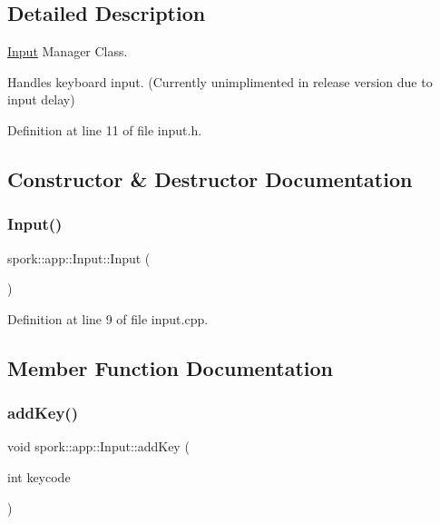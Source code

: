 \subsection{Detailed Description}
\hyperlink{classspork_1_1app_1_1_input}{Input} Manager Class. 

Handles keyboard input. (Currently unimplimented in release version due to input delay) 

Definition at line 11 of file input.\+h.



\subsection{Constructor \& Destructor Documentation}
\mbox{\label{classspork_1_1app_1_1_input_ade1285875cb237a23704d76b69957989}} 
\subsubsection{\texorpdfstring{Input()}{Input()}}
{\footnotesize\ttfamily spork\+::app\+::\+Input\+::\+Input (\begin{DoxyParamCaption}{ }\end{DoxyParamCaption})}



Definition at line 9 of file input.\+cpp.



\subsection{Member Function Documentation}
\mbox{\label{classspork_1_1app_1_1_input_a11538adf219ba9bbe9b450efa166ab3b}} 
\subsubsection{\texorpdfstring{add\+Key()}{addKey()}}
{\footnotesize\ttfamily void spork\+::app\+::\+Input\+::add\+Key (\begin{DoxyParamCaption}\item[{int}]{keycode }\end{DoxyParamCaption})}



